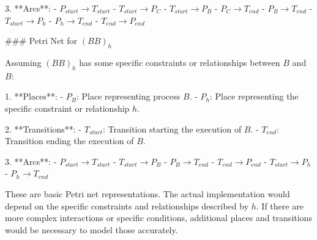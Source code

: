 3. **Arcs**:
   - \( P_{start} \rightarrow T_{start} \)
   - \( T_{start} \rightarrow P_C \)
   - \( T_{start} \rightarrow P_B \)
   - \( P_C \rightarrow T_{end} \)
   - \( P_B \rightarrow T_{end} \)
   - \( T_{start} \rightarrow P_h \)
   - \( P_h \rightarrow T_{end} \)
   - \( T_{end} \rightarrow P_{end} \)

### Petri Net for \( (B B)_h \)

Assuming \( (B B)_h \) has some specific constraints or relationships between \( B \) and \( B \):

1. **Places**:
   - \( P_B \): Place representing process \( B \).
   - \( P_h \): Place representing the specific constraint or relationship \( h \).

2. **Transitions**:
   - \( T_{start} \): Transition starting the execution of \( B \).
   - \( T_{end} \): Transition ending the execution of \( B \).

3. **Arcs**:
   - \( P_{start} \rightarrow T_{start} \)
   - \( T_{start} \rightarrow P_B \)
   - \( P_B \rightarrow T_{end} \)
   - \( T_{end} \rightarrow P_{end} \)
   - \( T_{start} \rightarrow P_h \)
   - \( P_h \rightarrow T_{end} \)

These are basic Petri net representations. The actual implementation would depend on the specific constraints and relationships described by \( h \). If there are more complex interactions or specific conditions, additional places and transitions would be necessary to model those accurately.